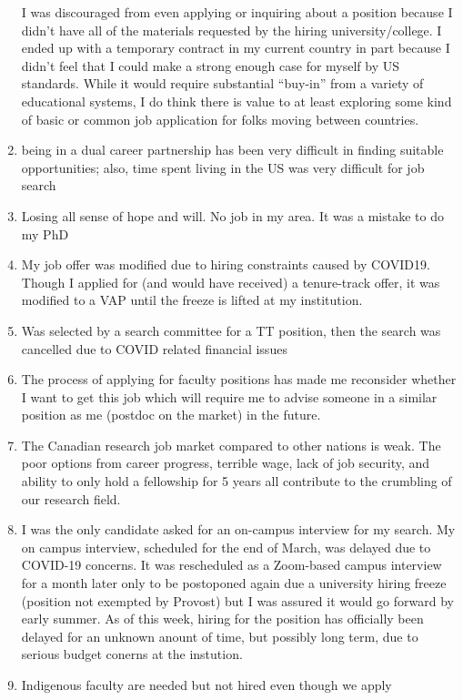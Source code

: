 \documentclass[]{article}
\begin{document}
\begin{enumerate}
  I was discouraged from even applying or inquiring about a position
  because I didn't have all of the materials requested by the hiring
  university/college. I ended up with a temporary contract in my current
  country in part because I didn't feel that I could make a strong
  enough case for myself by US standards. While it would require
  substantial ``buy-in'' from a variety of educational systems, I do
  think there is value to at least exploring some kind of basic or
  common job application for folks moving between countries.
\item
  being in a dual career partnership has been very difficult in finding
  suitable opportunities; also, time spent living in the US was very
  difficult for job search
\item
  Losing all sense of hope and will. No job in my area. It was a mistake
  to do my PhD
\item
  My job offer was modified due to hiring constraints caused by COVID19.
  Though I applied for (and would have received) a tenure-track offer,
  it was modified to a VAP until the freeze is lifted at my institution.
\item
  Was selected by a search committee for a TT position, then the search
  was cancelled due to COVID related financial issues
\item
  The process of applying for faculty positions has made me reconsider
  whether I want to get this job which will require me to advise someone
  in a similar position as me (postdoc on the market) in the future.
\item
  The Canadian research job market compared to other nations is weak.
  The poor options from career progress, terrible wage, lack of job
  security, and ability to only hold a fellowship for 5 years all
  contribute to the crumbling of our research field.
\item
  I was the only candidate asked for an on-campus interview for my
  search. My on campus interview, scheduled for the end of March, was
  delayed due to COVID-19 concerns. It was rescheduled as a Zoom-based
  campus interview for a month later only to be postoponed again due a
  university hiring freeze (position not exempted by Provost) but I was
  assured it would go forward by early summer. As of this week, hiring
  for the position has officially been delayed for an unknown anount of
  time, but possibly long term, due to serious budget conerns at the
  instution.
\item
  Indigenous faculty are needed but not hired even though we apply

\end{enumerate}
\end{document}
